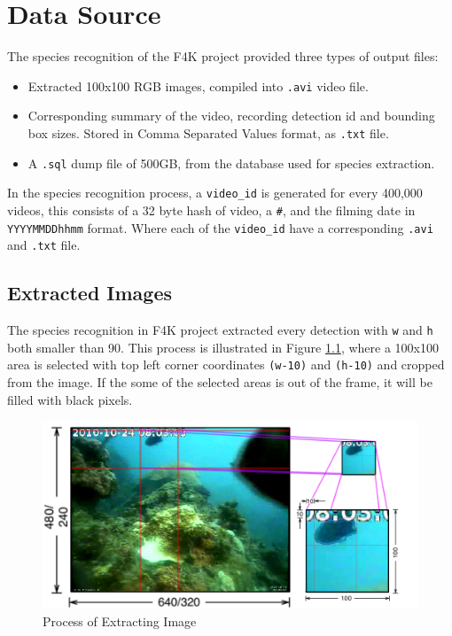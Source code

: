 \documentclass[bsc,frontabs,twoside,fullspacing,parskip,deptreport]{infthesis}
\begin{document}
\chapter{Data Source}
\label{chap:datasource}

The species recognition of the F4K project provided three types of output files:
\begin{itemize}
\setlength{\parskip}{1pt}
\item
Extracted 100x100 RGB images, compiled into {\tt .avi} video file.
\item
Corresponding summary of the video, recording detection id and bounding box sizes. Stored in Comma Separated Values format, as {\tt .txt} file.
\item
A {\tt .sql} dump file of 500GB, from the database used for species extraction.
\end{itemize}

In the species recognition process, a {\tt video\_id} is generated for every 400,000 videos, this consists of a 32 byte hash of video, a {\tt \#}, and the filming date in {\tt YYYYMMDDhhmm} format. Where each of the {\tt video\_id} have a corresponding {\tt .avi} and {\tt .txt} file.

\section{Extracted Images}
\label{sec:summaries}

The species recognition in F4K project extracted every detection with {\tt w} and {\tt h} both smaller than 90. 
This process is illustrated in Figure \ref{fig:extraction}, where a 100x100 area is selected with top left corner coordinates {\tt (w-10)} and {\tt (h-10)} and cropped from the image.
If the some of the selected areas is out of the frame, it will be filled with black pixels.

\begin{figure}[ht]
    \centering
    \includegraphics[scale=0.3]{graph/extraction.png}
    \caption{Process of Extracting Image}
    \label{fig:extraction}
\end{figure}
\end{document}
